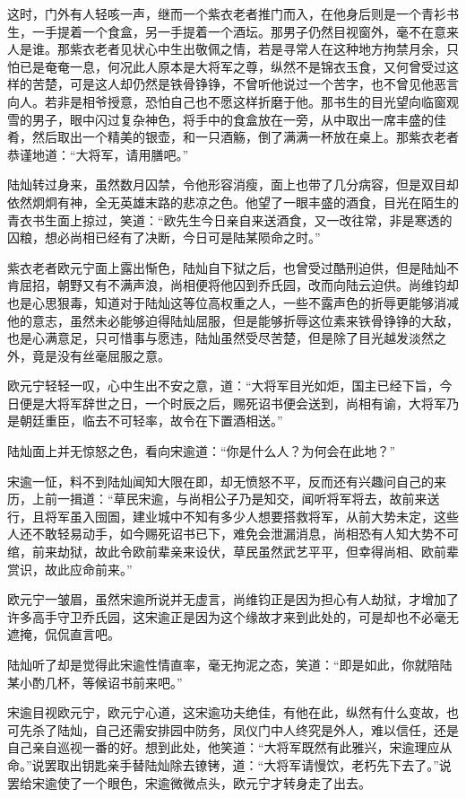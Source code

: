 这时，门外有人轻咳一声，继而一个紫衣老者推门而入，在他身后则是一个青衫书生，一手提着一个食盒，另一手提着一个酒坛。那男子仍然目视窗外，毫不在意来人是谁。那紫衣老者见状心中生出敬佩之情，若是寻常人在这种地方拘禁月余，只怕已是奄奄一息，何况此人原本是大将军之尊，纵然不是锦衣玉食，又何曾受过这样的苦楚，可是这人却仍然是铁骨铮铮，不曾听他说过一个苦字，也不曾见他恶言向人。若非是相爷授意，恐怕自己也不愿这样折磨于他。那书生的目光望向临窗观雪的男子，眼中闪过复杂神色，将手中的食盒放在一旁，从中取出一席丰盛的佳肴，然后取出一个精美的银壶，和一只酒觞，倒了满满一杯放在桌上。那紫衣老者恭谨地道：“大将军，请用膳吧。”

陆灿转过身来，虽然数月囚禁，令他形容消瘦，面上也带了几分病容，但是双目却依然炯炯有神，全无英雄末路的悲凉之色。他望了一眼丰盛的酒食，目光在陌生的青衣书生面上掠过，笑道：“欧先生今日亲自来送酒食，又一改往常，非是寒透的囚粮，想必尚相已经有了决断，今日可是陆某陨命之时。”

紫衣老者欧元宁面上露出惭色，陆灿自下狱之后，也曾受过酷刑迫供，但是陆灿不肯屈招，朝野又有不满声浪，尚相便将他囚到乔氏园，改而向陆云迫供。尚维钧却也是心思狠毒，知道对于陆灿这等位高权重之人，一些不露声色的折辱更能够消减他的意志，虽然未必能够迫得陆灿屈服，但是能够折辱这位素来铁骨铮铮的大敌，也是心满意足，只可惜事与愿违，陆灿虽然受尽苦楚，但是除了目光越发淡然之外，竟是没有丝毫屈服之意。

欧元宁轻轻一叹，心中生出不安之意，道：“大将军目光如炬，国主已经下旨，今日便是大将军辞世之日，一个时辰之后，赐死诏书便会送到，尚相有谕，大将军乃是朝廷重臣，临去不可轻率，故令在下置酒相送。”

陆灿面上并无惊怒之色，看向宋逾道：“你是什么人？为何会在此地？”

宋逾一怔，料不到陆灿闻知大限在即，却无愤怒不平，反而还有兴趣问自己的来历，上前一揖道：“草民宋逾，与尚相公子乃是知交，闻听将军将去，故前来送行，且将军虽入囹圄，建业城中不知有多少人想要搭救将军，从前大势未定，这些人还不敢轻易动手，如今赐死诏书已下，难免会泄漏消息，尚相恐有人知大势不可绾，前来劫狱，故此令欧前辈亲来设伏，草民虽然武艺平平，但幸得尚相、欧前辈赏识，故此应命前来。”

欧元宁一皱眉，虽然宋逾所说并无虚言，尚维钧正是因为担心有人劫狱，才增加了许多高手守卫乔氏园，这宋逾正是因为这个缘故才来到此处的，可是却也不必毫无遮掩，侃侃直言吧。

陆灿听了却是觉得此宋逾性情直率，毫无拘泥之态，笑道：“即是如此，你就陪陆某小酌几杯，等候诏书前来吧。”

宋逾目视欧元宁，欧元宁心道，这宋逾功夫绝佳，有他在此，纵然有什么变故，也可先杀了陆灿，自己还需安排园中防务，凤仪门中人终究是外人，难以信任，还是自己亲自巡视一番的好。想到此处，他笑道：“大将军既然有此雅兴，宋逾理应从命。”说罢取出钥匙亲手替陆灿除去镣铐，道：“大将军请慢饮，老朽先下去了。”说罢给宋逾使了一个眼色，宋逾微微点头，欧元宁才转身走了出去。

